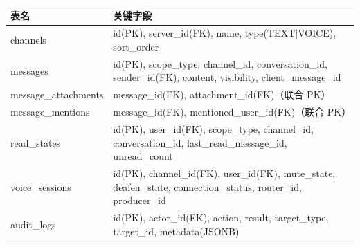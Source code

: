 \noindent\begin{tabularx}{\textwidth}{L{3.2cm}Y}
\toprule
\textbf{表名} & \textbf{关键字段} \\
\midrule
channels & id(PK), server\_id(FK), name, type(TEXT$|$VOICE), sort\_order \\
messages & id(PK), scope\_type, channel\_id, conversation\_id, sender\_id(FK), content, visibility, client\_message\_id \\
message\_attachments & message\_id(FK), attachment\_id(FK)（联合 PK）\\
message\_mentions & message\_id(FK), mentioned\_user\_id(FK)（联合 PK）\\
read\_states & id(PK), user\_id(FK), scope\_type, channel\_id, conversation\_id, last\_read\_message\_id, unread\_count \\
voice\_sessions & id(PK), channel\_id(FK), user\_id(FK), mute\_state, deafen\_state, connection\_status, router\_id, producer\_id \\
audit\_logs & id(PK), actor\_id(FK), action, result, target\_type, target\_id, metadata(JSONB) \\
\bottomrule
\end{tabularx}